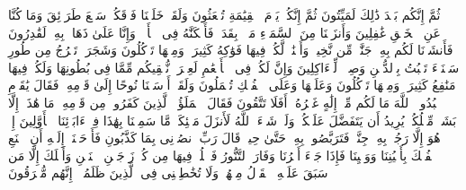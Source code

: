 \stopbuffer%
\startbuffer[\q:23:15]
ثُمَّ إِنَّكُم بَعۡدَ ذَٰلِكَ لَمَیِّتُونَ%
\stopbuffer%
\startbuffer[\q:23:16]
ثُمَّ إِنَّكُمۡ یَوۡمَ ٱلۡقِیَٰمَةِ تُبۡعَثُونَ%
\stopbuffer%
\startbuffer[\q:23:17]
وَلَقَدۡ خَلَقۡنَا فَوۡقَكُمۡ سَبۡعَ طَرَاۤئِقَ وَمَا كُنَّا عَنِ ٱلۡخَلۡقِ غَٰفِلِینَ%
\stopbuffer%
\startbuffer[\q:23:18]
وَأَنزَلۡنَا مِنَ ٱلسَّمَاۤءِ مَاۤءَۢ بِقَدَرࣲ فَأَسۡكَنَّٰهُ فِی ٱلۡأَرۡضِۖ وَإِنَّا عَلَىٰ ذَهَابِۭ بِهِۦ لَقَٰدِرُونَ%
\stopbuffer%
\startbuffer[\q:23:19]
فَأَنشَأۡنَا لَكُم بِهِۦ جَنَّٰتࣲ مِّن نَّخِیلࣲ وَأَعۡنَٰبࣲ لَّكُمۡ فِیهَا فَوَٰكِهُ كَثِیرَةࣱ وَمِنۡهَا تَأۡكُلُونَ%
\stopbuffer%
\startbuffer[\q:23:20]
وَشَجَرَةࣰ تَخۡرُجُ مِن طُورِ سَیۡنَاۤءَ تَنۢبُتُ بِٱلدُّهۡنِ وَصِبۡغࣲ لِّلۡءَاكِلِینَ%
\stopbuffer%
\startbuffer[\q:23:21]
وَإِنَّ لَكُمۡ فِی ٱلۡأَنۡعَٰمِ لَعِبۡرَةࣰۖ نُّسۡقِیكُم مِّمَّا فِی بُطُونِهَا وَلَكُمۡ فِیهَا مَنَٰفِعُ كَثِیرَةࣱ وَمِنۡهَا تَأۡكُلُونَ%
\stopbuffer%
\startbuffer[\q:23:22]
وَعَلَیۡهَا وَعَلَى ٱلۡفُلۡكِ تُحۡمَلُونَ%
\stopbuffer%
\startbuffer[\q:23:23]
وَلَقَدۡ أَرۡسَلۡنَا نُوحًا إِلَىٰ قَوۡمِهِۦ فَقَالَ یَٰقَوۡمِ ٱعۡبُدُوا۟ ٱللَّهَ مَا لَكُم مِّنۡ إِلَٰهٍ غَیۡرُهُۥۤۚ أَفَلَا تَتَّقُونَ%
\stopbuffer%
\startbuffer[\q:23:24]
فَقَالَ ٱلۡمَلَؤُا۟ ٱلَّذِینَ كَفَرُوا۟ مِن قَوۡمِهِۦ مَا هَٰذَاۤ إِلَّا بَشَرࣱ مِّثۡلُكُمۡ یُرِیدُ أَن یَتَفَضَّلَ عَلَیۡكُمۡ وَلَوۡ شَاۤءَ ٱللَّهُ لَأَنزَلَ مَلَٰۤئِكَةࣰ مَّا سَمِعۡنَا بِهَٰذَا فِیۤ ءَابَاۤئِنَا ٱلۡأَوَّلِینَ%
\stopbuffer%
\startbuffer[\q:23:25]
إِنۡ هُوَ إِلَّا رَجُلُۢ بِهِۦ جِنَّةࣱ فَتَرَبَّصُوا۟ بِهِۦ حَتَّىٰ حِینࣲ%
\stopbuffer%
\startbuffer[\q:23:26]
قَالَ رَبِّ ٱنصُرۡنِی بِمَا كَذَّبُونِ%
\stopbuffer%
\startbuffer[\q:23:27]
فَأَوۡحَیۡنَاۤ إِلَیۡهِ أَنِ ٱصۡنَعِ ٱلۡفُلۡكَ بِأَعۡیُنِنَا وَوَحۡیِنَا فَإِذَا جَاۤءَ أَمۡرُنَا وَفَارَ ٱلتَّنُّورُ فَٱسۡلُكۡ فِیهَا مِن كُلࣲّ زَوۡجَیۡنِ ٱثۡنَیۡنِ وَأَهۡلَكَ إِلَّا مَن سَبَقَ عَلَیۡهِ ٱلۡقَوۡلُ مِنۡهُمۡۖ وَلَا تُخَٰطِبۡنِی فِی ٱلَّذِینَ ظَلَمُوۤا۟ إِنَّهُم مُّغۡرَقُونَ%
\stopbuffer%
